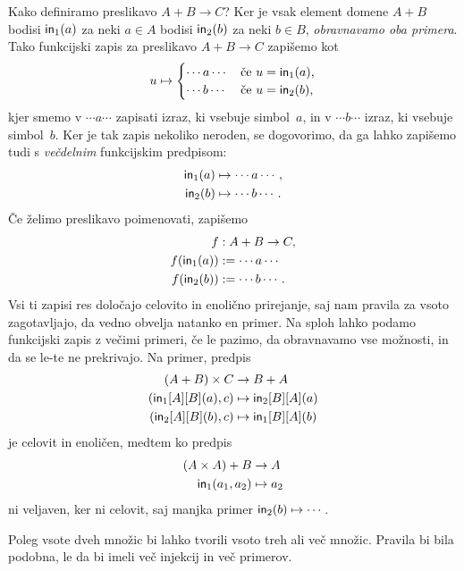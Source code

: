 Kako definiramo preslikavo $A + B \to C$? Ker je vsak element domene $A + B$ bodisi
$\mathsf{in}_{1}(a)$ za neki $a \in A$ bodisi $\mathsf{in}_{2}(b)$ za neki $b \in B$, \emph{obravnavamo oba
  primera}. Tako funkcijski zapis za preslikavo $A + B \to C$ zapišemo kot
%
\begin{equation*}
  u \mapsto
  \begin{cases}
    \cdots a \cdots & \text{če $u = \mathsf{in}_{1}(a)$,}\\
    \cdots b \cdots & \text{če $u = \mathsf{in}_{2}(b)$,}
  \end{cases}
\end{equation*}
%
kjer smemo v $\cdots a \cdots$ zapisati izraz, ki vsebuje simbol~$a$, in v
$\cdots b \cdots$ izraz, ki vsebuje simbol~$b$. Ker je tak zapis nekoliko neroden, se
dogovorimo, da ga lahko zapišemo tudi s \emph{večdelnim} funkcijskim predpisom:
%
\begin{align*}
  \mathsf{in}_{1}(a) &\mapsto \cdots a \cdots, \\
  \mathsf{in}_{2}(b) &\mapsto \cdots b \cdots.
\end{align*}
%
Če želimo preslikavo poimenovati, zapišemo
%
\begin{align*}
  f &: A + B \to C, \\
  f(\mathsf{in}_{1}(a)) &\mathrel{{:}{=}} \cdots a \cdots \\
  f(\mathsf{in}_{2}(b)) &\mathrel{{:}{=}} \cdots b \cdots.
\end{align*}
%
Vsi ti zapisi res določajo celovito in enolično prirejanje, saj nam pravila za vsoto
zagotavljajo, da vedno obvelja natanko en primer. Na sploh lahko podamo funkcijski zapis z
večimi primeri, če le pazimo, da obravnavamo vse možnosti, in da se le-te ne prekrivajo.
Na primer, predpis
%
\begin{align*}
  (A + B) \times C &\to B + A \\
  (\mathsf{in}_{1}[A][B](a), c) &\mapsto \mathsf{in}_{2}[B][A](a) \\
  (\mathsf{in}_{2}[A][B](b), c) &\mapsto \mathsf{in}_{1}[B][A](b)
\end{align*}
%
je celovit in enoličen, medtem ko predpis
%
\begin{align*}
  (A \times A) + B &\to A \\
  \mathsf{in}_{1}(a_1, a_2) &\mapsto a_2
\end{align*}
%
ni veljaven, ker ni celovit, saj manjka primer $\mathsf{in}_{2}(b) \mapsto \cdots$.

Poleg vsote dveh množic bi lahko tvorili vsoto treh ali več množic. Pravila bi bila
podobna, le da bi imeli več injekcij in več primerov.




